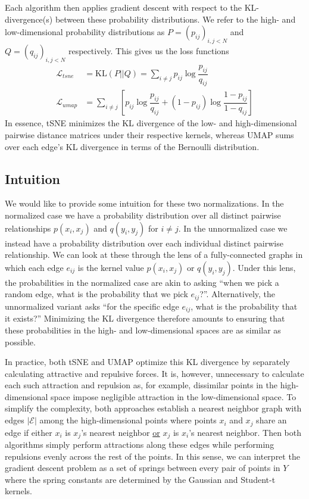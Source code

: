 \documentclass{article}
\theoremstyle{definition}
\begin{document}
Each algorithm then applies gradient descent with respect to the KL-divergence(s) between these probability distributions. We refer to the high- and
low-dimensional probability
distributions as $P = \left( p_{ij} \right)_{i, j < N}$ and $Q = \left( q_{ij}
\right)_{i, j < N}$ respectively. This gives us the loss functions
\begin{align}
    \mathcal{L}_{tsne} &= \text{KL} (P || Q) = \sum_{i \neq j} p_{ij} \log \dfrac{p_{ij}}{q_{ij}} \\
    \mathcal{L}_{umap} &= \sum_{i \neq j} \left[ p_{ij} \log \dfrac{p_{ij}}{q_{ij}} + (1 - p_{ij}) \log \dfrac{1 - p_{ij}}{1 - q_{ij}} \right]
\end{align}
In essence, tSNE minimizes the KL divergence of the low- and high-dimensional pairwise distance matrices under their respective kernels, whereas UMAP sums over
each edge's KL divergence in terms of the Bernoulli distribution.

\subsection{Intuition}

We would like to provide some intuition for these two normalizations. In the normalized case we have a probability distribution over all
distinct pairwise relationships $p(x_i, x_j)$ and $q(y_i, y_j)$ for $i \neq j$. In the unnormalized case we instead have a probability distribution over each
individual distinct pairwise relationship. We can look at these through the lens of a fully-connected graphs in which each edge $e_{ij}$ is the
kernel value $p(x_i, x_j)$ or $q(y_i, y_j)$. Under this lens, the probabilities in the normalized case are akin to asking ``when we pick a random edge, what is the
probability that we pick $e_{ij}$?''. Alternatively, the unnormalized variant asks ``for the specific edge $e_{ij}$, what is the probability that it exists?''
Minimizing the KL divergence therefore amounts to ensuring that these probabilities in the high- and low-dimensional spaces are as similar as possible.

In practice, both tSNE and UMAP optimize this KL divergence by separately calculating attractive and repulsive forces. It is, however, unnecessary to calculate
each such attraction and repulsion as, for example, dissimilar points in the high-dimensional space impose negligible attraction in the low-dimensional space.
To simplify the complexity, both approaches establish a nearest neighbor graph \cite{van2014accelerating} with edges $|\mathcal{E}|$ among the
high-dimensional points where points $x_i$ and $x_j$ share an edge if either $x_i$ is $x_j$'s nearest neighbor \underline{or} $x_j$ is $x_i$'s nearest neighbor.
Then both algorithms simply perform attractions along these edges while performing repulsions evenly across the rest of the points. In this sense, we can
interpret the gradient descent problem as a set of springs between every pair of points in $Y$ where the spring constants are determined by the Gaussian and
Student-t kernels.
\end{document}
